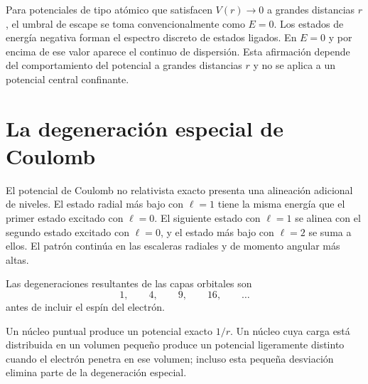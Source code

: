 Para potenciales de tipo atómico que satisfacen \(V(r)\to0\) a grandes distancias \(r\), el umbral de escape se toma convencionalmente como \(E=0\). Los estados de energía negativa forman el espectro discreto de estados ligados. En \(E=0\) y por encima de ese valor aparece el continuo de dispersión. Esta afirmación depende del comportamiento del potencial a grandes distancias \(r\) y no se aplica a un potencial central confinante.

\section{La degeneración especial de Coulomb}

El potencial de Coulomb no relativista exacto presenta una alineación adicional de niveles. El estado radial más bajo con \(\ell=1\) tiene la misma energía que el primer estado excitado con \(\ell=0\). El siguiente estado con \(\ell=1\) se alinea con el segundo estado excitado con \(\ell=0\), y el estado más bajo con \(\ell=2\) se suma a ellos. El patrón continúa en las escaleras radiales y de momento angular más altas.

\begin{classroomqa}
\end{classroomqa}

Las degeneraciones resultantes de las capas orbitales son
\begin{equation}
1,\qquad 4,\qquad 9,\qquad 16,\qquad \ldots
\end{equation}
antes de incluir el espín del electrón.

\begin{classroomqa}
\end{classroomqa}

Un núcleo puntual produce un potencial exacto \(1/r\). Un núcleo cuya carga está distribuida en un volumen pequeño produce un potencial ligeramente distinto cuando el electrón penetra en ese volumen; incluso esta pequeña desviación elimina parte de la degeneración especial.


